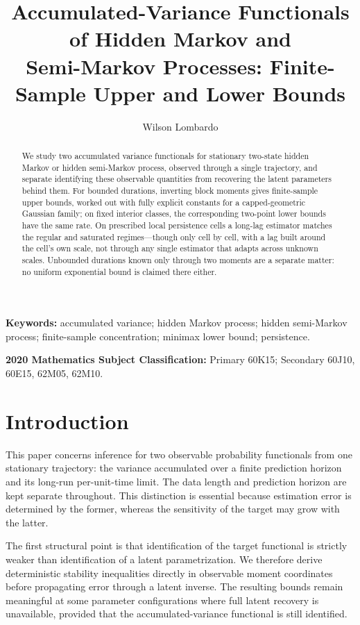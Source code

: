 \documentclass[11pt]{article}
\title{Accumulated-Variance Functionals of Hidden Markov and\\
Semi-Markov Processes: Finite-Sample Upper and Lower Bounds}
\author{Wilson Lombardo}
\date{}
\theoremstyle{definition}
\theoremstyle{remark}
\begin{document}
\maketitle

\begin{abstract}
We study two accumulated variance functionals for stationary two-state hidden
Markov or hidden semi-Markov process, observed through a single trajectory,
and separate identifying these observable quantities from recovering the
latent parameters behind them.  For bounded durations, inverting block
moments gives finite-sample upper bounds, worked out with fully explicit
constants for a capped-geometric Gaussian family; on fixed interior classes,
the corresponding two-point lower bounds have the same rate.  On prescribed
local persistence cells a long-lag estimator matches the regular and saturated
regimes---though only cell by cell, with a lag built around
the cell's own scale, not through any single estimator that adapts across
unknown scales.  Unbounded durations known only through two moments are a
separate matter: no uniform exponential bound is claimed there either.
\end{abstract}

\medskip
\noindent\textbf{Keywords:} accumulated variance; hidden Markov process;
hidden semi-Markov process; finite-sample concentration; minimax lower bound;
persistence.

\medskip
\noindent\textbf{2020 Mathematics Subject Classification:}
Primary 60K15; Secondary 60J10, 60E15, 62M05, 62M10.

\section{Introduction}

This paper concerns inference for two observable probability functionals from
one stationary trajectory: the variance accumulated over a finite prediction
horizon and its long-run per-unit-time limit.  The data length and prediction
horizon are kept separate throughout.  This distinction is essential because
estimation error is determined by the former, whereas the sensitivity of the
target may grow with the latter.

The first structural point is that identification of the target functional is
strictly weaker than identification of a latent parametrization.  We therefore
derive deterministic stability inequalities directly in observable moment
coordinates before propagating error through a latent inverse.  The resulting
bounds remain meaningful at some parameter configurations where full latent
recovery is unavailable, provided that the accumulated-variance functional is
still identified.
\end{document}
